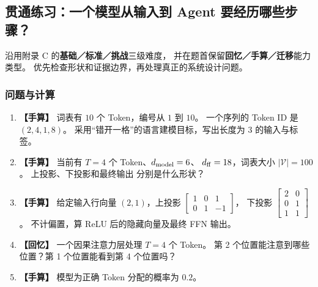\subsection{贯通练习：一个模型从输入到 Agent 要经历哪些步骤？}
\label{intro:25b-modern-practice}

沿用附录 C 的\textbf{基础／标准／挑战}三级难度，
并在题首保留\textbf{回忆／手算／迁移}能力类型。
优先检查形状和证据边界，再处理真正的系统设计问题。

\subsubsection{问题与计算}

\begin{enumerate}[label=\textbf{C2-\arabic*.},leftmargin=2.8em]
\item {}\label{exercise:C2-1}  \label{exercise:linked-20b-task-contract}  \textbf{【手算】} 词表有 $10$ 个 Token，编号从 $1$ 到 $10$。
一个序列的 Token ID 是 $(2,4,1,8)$。
采用“错开一格”的语言建模目标，写出长度为 $3$ 的输入与标签。
\item {}\label{exercise:C2-2}  \label{exercise:linked-10b-ffn-output-head}  \textbf{【手算】} 当前有 $T=4$ 个 Token、$d_{\rm model}=6$、
$d_{\rm ff}=18$，词表大小 $|\mathcal V|=100$。
 上投影、下投影和最终输出  分别是什么形状？
\item {}\label{exercise:C2-3}   \textbf{【手算】} 给定输入行向量 $(2,1)$，上投影
$\begin{bmatrix}1&0&1\\0&1&-1\end{bmatrix}$，
下投影 $\begin{bmatrix}2&0\\0&1\\1&1\end{bmatrix}$。
不计偏置，算 ReLU 后的隐藏向量及最终 FFN 输出。
\item {}\label{exercise:C2-4}  \label{exercise:linked-22-transformer-architecture}  \textbf{【回忆】} 一个因果注意力层处理 $T=4$ 个 Token。
第 2 个位置能注意到哪些位置？第 1 个位置能看到第 4 个位置吗？
\item {}\label{exercise:C2-5}  \label{exercise:linked-20c-classification-loss}  \textbf{【手算】} 模型为正确 Token 分配的概率为 $0.2$。

\end{enumerate}
